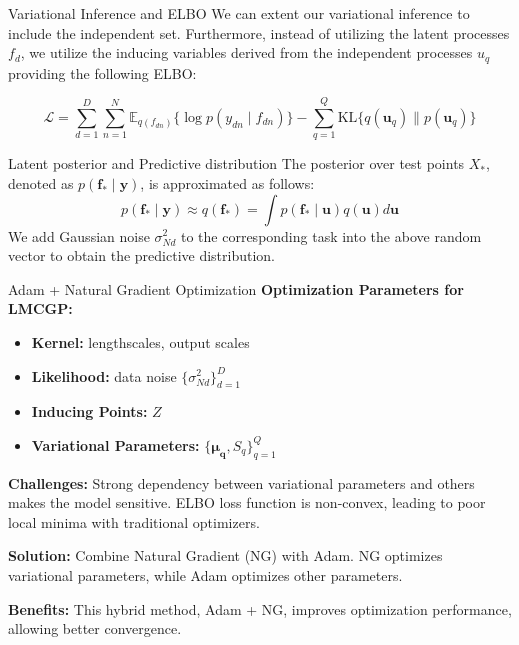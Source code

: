 \begin{frame}{Variational Inference and ELBO}
	We can extent our variational inference to include the independent set. Furthermore, instead of utilizing the latent processes $f_d$, we utilize the inducing variables derived from the independent processes $u_q$ providing the following ELBO:
	
	\begin{equation*}\label{eq:lmc_elbo}
		\mathcal{L} = \sum_{d=1}^D\sum_{n=1}^{N} \mathbb{E}_{q(f_{dn})}\{\log p(y_{dn} \mid f_{dn})\} - \sum_{q=1}^Q \text{KL}\{q(\mathbf{u}_q)\parallel p(\mathbf{u}_q)\}
	\end{equation*}
	
\end{frame}

\begin{frame}{Latent posterior and Predictive distribution}
	The posterior over test points $X_*$, denoted as $p(\mathbf{f}_* \mid \mathbf{y})$, is approximated as follows:
	\begin{equation*}
		p(\mathbf{f}_* \mid \mathbf{y}) \approx q(\mathbf{f}_*) = \int p(\mathbf{f}_* \mid \mathbf{u}) q(\mathbf{u}) d \mathbf{u}
	\end{equation*}
	We add Gaussian noise $\sigma_{Nd}^2$ to the corresponding task into the above random vector to obtain the predictive distribution.
\end{frame}

\begin{frame}{Adam + Natural Gradient Optimization} \textbf{Optimization Parameters for LMCGP:} \begin{itemize} \item \textbf{Kernel:} lengthscales, output scales \item \textbf{Likelihood:} data noise $\{ \sigma^2_{Nd} \}_{d=1}^D$ \item \textbf{Inducing Points:} $Z$ \item \textbf{Variational Parameters:} $\{\mathbf{\mu_q}, S_q\}_{q=1}^Q$ \end{itemize}
	
	\textbf{Challenges:} Strong dependency between variational parameters and others makes the model sensitive. ELBO loss function is non-convex, leading to poor local minima with traditional optimizers.
	
	\textbf{Solution:} Combine Natural Gradient (NG) with Adam. NG optimizes variational parameters, while Adam optimizes other parameters.
	
	\textbf{Benefits:} This hybrid method, Adam + NG, improves optimization performance, allowing better convergence.
\end{frame}

